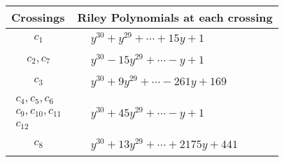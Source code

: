 \documentclass[1p]{elsarticle_modified}
\theoremstyle{definition}
\begin{document}
\begin{tabular}{m{50pt}|m{274pt}}
Crossings & \hspace{64pt}Riley Polynomials at each crossing \\
\hline $$\begin{aligned}c_{1}\end{aligned}$$&$\begin{aligned}
&y^{30}+y^{29}+\cdots+15 y+1
\end{aligned}$\\
\hline $$\begin{aligned}c_{2},c_{7}\end{aligned}$$&$\begin{aligned}
&y^{30}-15 y^{29}+\cdots- y+1
\end{aligned}$\\
\hline $$\begin{aligned}c_{3}\end{aligned}$$&$\begin{aligned}
&y^{30}+9 y^{29}+\cdots-261 y+169
\end{aligned}$\\
\hline $$\begin{aligned}c_{4},c_{5},c_{6}\\c_{9},c_{10},c_{11}\\c_{12}\end{aligned}$$&$\begin{aligned}
&y^{30}+45 y^{29}+\cdots- y+1
\end{aligned}$\\
\hline $$\begin{aligned}c_{8}\end{aligned}$$&$\begin{aligned}
&y^{30}+13 y^{29}+\cdots+2175 y+441
\end{aligned}$\\
\hline
\end{tabular}
\vskip 2pc
\end{document}
